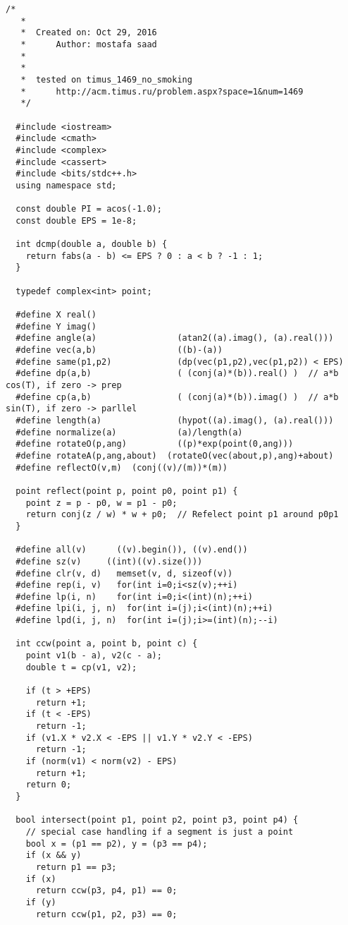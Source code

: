 \begin{lstlisting}[style=cpp]
  /*
   *
   *  Created on: Oct 29, 2016
   *      Author: mostafa saad
   *
   *
   *  tested on timus_1469_no_smoking
   *      http://acm.timus.ru/problem.aspx?space=1&num=1469
   */

  #include <iostream>
  #include <cmath>
  #include <complex>
  #include <cassert>
  #include <bits/stdc++.h>
  using namespace std;

  const double PI = acos(-1.0);
  const double EPS = 1e-8;

  int dcmp(double a, double b) {
    return fabs(a - b) <= EPS ? 0 : a < b ? -1 : 1;
  }

  typedef complex<int> point;

  #define X real()
  #define Y imag()
  #define angle(a)                (atan2((a).imag(), (a).real()))
  #define vec(a,b)                ((b)-(a))
  #define same(p1,p2)             (dp(vec(p1,p2),vec(p1,p2)) < EPS)
  #define dp(a,b)                 ( (conj(a)*(b)).real() )  // a*b cos(T), if zero -> prep
  #define cp(a,b)                 ( (conj(a)*(b)).imag() )  // a*b sin(T), if zero -> parllel
  #define length(a)               (hypot((a).imag(), (a).real()))
  #define normalize(a)            (a)/length(a)
  #define rotateO(p,ang)          ((p)*exp(point(0,ang)))
  #define rotateA(p,ang,about)  (rotateO(vec(about,p),ang)+about)
  #define reflectO(v,m)  (conj((v)/(m))*(m))

  point reflect(point p, point p0, point p1) {
    point z = p - p0, w = p1 - p0;
    return conj(z / w) * w + p0;  // Refelect point p1 around p0p1
  }

  #define all(v)      ((v).begin()), ((v).end())
  #define sz(v)     ((int)((v).size()))
  #define clr(v, d)   memset(v, d, sizeof(v))
  #define rep(i, v)   for(int i=0;i<sz(v);++i)
  #define lp(i, n)    for(int i=0;i<(int)(n);++i)
  #define lpi(i, j, n)  for(int i=(j);i<(int)(n);++i)
  #define lpd(i, j, n)  for(int i=(j);i>=(int)(n);--i)

  int ccw(point a, point b, point c) {
    point v1(b - a), v2(c - a);
    double t = cp(v1, v2);

    if (t > +EPS)
      return +1;
    if (t < -EPS)
      return -1;
    if (v1.X * v2.X < -EPS || v1.Y * v2.Y < -EPS)
      return -1;
    if (norm(v1) < norm(v2) - EPS)
      return +1;
    return 0;
  }

  bool intersect(point p1, point p2, point p3, point p4) {
    // special case handling if a segment is just a point
    bool x = (p1 == p2), y = (p3 == p4);
    if (x && y)
      return p1 == p3;
    if (x)
      return ccw(p3, p4, p1) == 0;
    if (y)
      return ccw(p1, p2, p3) == 0;


\end{lstlisting}
